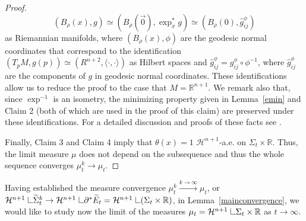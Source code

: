 \documentclass[11pt]{amsart}
\def\R{\mathbb{R}}
\def\r{\rho}
\def\H{\mathcal{H}}
\def\wt{\widetilde}
\def\res{\hbox{ {\vrule height .25cm}{\leaders\hrule\hskip.2cm}}\hskip5.0\mu}
\begin{document}
\begin{proof}
\[(B_\r(x), g)\simeq(B_\r(\vec 0), \exp^*_x g)\simeq (B_\r(0), \hat g_{ij}^\phi)\]
as Riemannian manifolds, where $(B_\r(x), \phi)$ are
the geodesic normal coordinates that correspond to the identification $(T_pM, g(p))\simeq(R^{n+2}, \langle\cdot,\cdot\rangle)$ as Hilbert spaces and $\hat g_{ij}^\phi=g_{ij}^\phi\circ\phi^{-1}$, where $\hat g_{ij}^\phi$
are the components of $g$ in geodesic normal coordinates. These identifications allow us to reduce the proof to the case that $M=\R^{n+1}$.  We remark also that, since $\exp^{-1}$ is an isometry, the minimizing property given in Lemma~\ref{emin} and Claim 2 (both of which are used in the proof of this claim) are preserved under these identifications. For a detailed discussion and proofs of these facts see \cite{Alex}.


 
 Finally, Claim 3 and Claim 4 imply that $\theta(x)=1$ $\H^{n+1}$-a.e. on $\Sigma_t\times\R$. Thus, the limit measure $\mu$ does not depend on the subsequence and thus the whole sequence converges $\mu_t^k\to \mu_t$.
\end{proof}

Having established the measure convergence $\mu_t^k\stackrel{k\to\infty}{\longrightarrow}\mu_t$, or  $\H^{n+1}\res \wt \Sigma_t^k\to \H^{n+1}\res \partial^*\wt E_t= \H^{n+1}\res (\Sigma_t\times\R)$,
in Lemma~\ref{mainconvergence}, we would like to study now the limit of the measures $\mu_t=\H^{n+1}\res \Sigma_t\times\R$ as $t\to\infty$.
\end{document}
